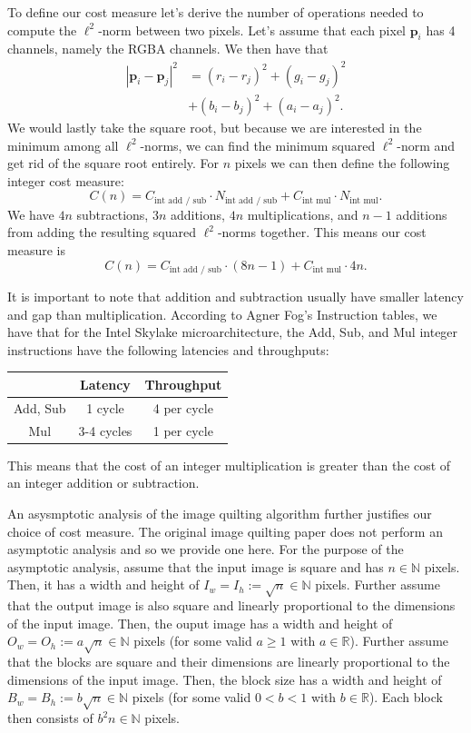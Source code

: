 \documentclass[letterpaper]{article}
\newcommand{\R}[0]{\mathbb{R}}
\newcommand{\N}[0]{\mathbb{N}}
\begin{document}
To define our cost measure let's derive the number of operations needed to compute the $\ell ^2$-norm between two pixels. Let's assume that each pixel $\bm{p}_i$ has 4 channels, namely the RGBA channels. We then have that
\begin{align*}
  |\bm{p}_i - \bm{p}_j| ^2 & = (r_i - r_j)^2 + (g_i - g_j)^2 \\
  & + (b_i - b_j)^2 + (a_i - a_j)^2.
\end{align*}
We would lastly take the square root, but because we are interested in the minimum among all $\ell ^2$-norms, we can find the minimum squared $\ell ^2$-norm and get rid of the square root entirely. For $n$ pixels we can then define the following integer cost measure:
\[
  C(n) = C _\text{int add / sub} \cdot N _\text{int add / sub} + C_\text{int mul} \cdot N _\text{int mul}.
\]
We have $4n$ subtractions, $3n$ additions, $4n$ multiplications, and $n-1$ additions from adding the resulting squared $\ell ^2$-norms together. This means our cost measure is
\[
  C(n) = C _\text{int add / sub} \cdot (8n - 1) + C_\text{int mul} \cdot 4n.
\]

It is important to note that addition and subtraction usually have smaller latency and gap than multiplication. According to Agner Fog's Instruction tables, we have that for the Intel Skylake microarchitecture, the Add, Sub, and Mul integer instructions have the following latencies and throughputs:

\begin{center}
  \begin{tabular}{c|c|c}
    & Latency & Throughput \\
    \hline
    Add, Sub & 1 cycle & 4 per cycle \\
    \hline
    Mul & 3-4 cycles & 1 per cycle \\
  \end{tabular}
\end{center}

This means that the cost of an integer multiplication is greater than the cost of an integer addition or subtraction.

An asysmptotic analysis of the image quilting algorithm further justifies our choice of cost measure. The original image quilting paper \cite{Efros:01} does not perform an asymptotic analysis and so we provide one here. For the purpose of the asymptotic analysis, assume that the input image is square and has $n \in \N$ pixels. Then, it has a width and height of $I_w = I_h := \sqrt{n} \in \N$ pixels. Further assume that the output image is also square and linearly proportional to the dimensions of the input image. Then, the ouput image has a width and height of $O_w = O_h := a \sqrt{n} \in \N$ pixels (for some valid $a \ge 1$ with $a \in \R$). Further assume that the blocks are square and their dimensions are linearly proportional to the dimensions of the input image. Then, the block size has a width and height of $B_w = B_h := b \sqrt{n} \in \N$ pixels (for some valid $0 < b < 1$ with $b \in \R$). Each block then consists of $b^2 n \in \N$ pixels.
\end{document}
